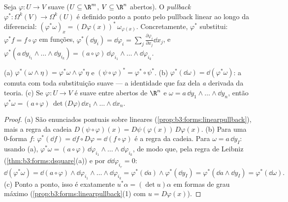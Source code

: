 \begin{definition}[Pullback]\label{def:b3:forms:pullback}
Seja $\varphi\colon U \to V$ suave ($U \subseteq \R^m$, $V \subseteq \R^n$ abertos). O \emph{pullback}
$\varphi^*\colon \Omega^k(V) \to \Omega^k(U)$ é definido ponto a ponto pelo pullback linear ao longo da
diferencial: $(\varphi^*\omega)_x = (D\varphi(x))^*\,\omega_{\varphi(x)}$. Concretamente, $\varphi^*$ substitui: $\varphi^*f = f \circ
\varphi$ em funções,
$\varphi^*(\dd y_i) =
\dd\varphi_i = \sum_j\frac{\partial\varphi_i}{\partial
x_j}\dd x_j$, e $\varphi^*(a\,\dd y_{i_1}\wedge\dots\wedge
\dd y_{i_k}) =
(a\circ\varphi)\,\dd\varphi_{i_1}\wedge\dots\wedge
\dd\varphi_{i_k}$.
\end{definition}

\begin{theorem}\label{thm:b3:forms:pullback}
(a) $\varphi^*(\omega \wedge \eta) = \varphi^*\omega \wedge
\varphi^*\eta$ e $(\psi \circ \varphi)^* = \varphi^* \circ
\psi^*$.
(b) $\varphi^*(\dd\omega) = \dd(\varphi^*\omega)$: a  comuta com toda substituição suave --- a
identidade que faz dela \emph{a} derivada da teoria.
(c) Se $\varphi\colon U \to V$ é suave entre abertos de $\R^n$ e $\omega = a\,\dd y_1 \wedge \dots \wedge \dd
y_n$, então $\varphi^*\omega = (a \circ
\varphi)\,\det\bigl(D\varphi\bigr)\,\dd x_1 \wedge \dots
\wedge \dd x_n$.
\end{theorem}

\begin{proof}
(a) São enunciados pontuais sobre  lineares
(\cref{prop:b3:forms:linearpullback}), mais a regra da cadeia $D(\psi\circ\varphi)(x) = D\psi(\varphi(x))\,D\varphi(x)$.
(b) Para uma $0$-forma $f$: $\varphi^*(\dd f) = \dd f \circ
D\varphi = \dd(f \circ \varphi)$ é a regra da cadeia. Para
$\omega = a\,\dd y_I$: usando (a), $\varphi^*\omega =
(a\circ\varphi)\,\dd\varphi_{i_1}\wedge\dots\wedge
\dd\varphi_{i_k}$, de modo que, pela regra de Leibniz
(\cref{thm:b3:forms:dsquare}(a)) e por $\dd\dd\varphi_{i_r} =
0$:
\[
\dd(\varphi^*\omega) = \dd(a\circ\varphi) \wedge
\dd\varphi_{i_1}\wedge\dots\wedge\dd\varphi_{i_k}
= \varphi^*(\dd a) \wedge \varphi^*(\dd y_I)
= \varphi^*(\dd a \wedge \dd y_I) =
\varphi^*(\dd\omega).
\]
(c) Ponto a ponto, isso é exatamente $u^*\alpha = (\det u)\alpha$ em formas de grau máximo
(\cref{prop:b3:forms:linearpullback}(1) com $u = D\varphi(x)$).
\end{proof}

